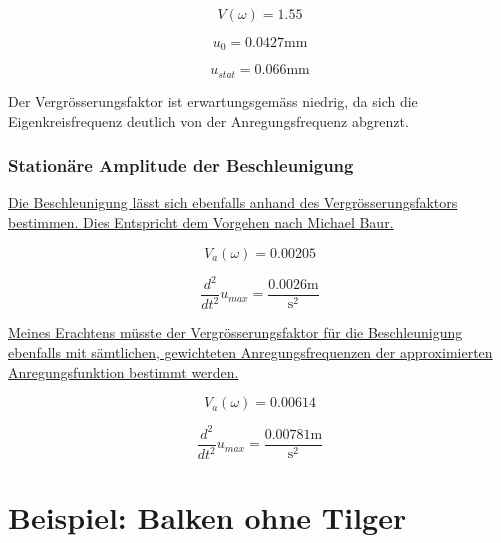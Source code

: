 \documentclass[
  letterpaper,
  DIV=11]{scrreprt}
\begin{document}
\begin{equation}V{\left(\omega \right)} = 1.55\end{equation}

\begin{equation}u_{0} = 0.0427 \text{mm}\end{equation}

\begin{equation}u_{stat} = 0.066 \text{mm}\end{equation}

Der Vergrösserungsfaktor ist erwartungsgemäss niedrig, da sich die
Eigenkreisfrequenz deutlich von der Anregungsfrequenz abgrenzt.

\hypertarget{stationuxe4re-amplitude-der-beschleunigung}{%
\subsection{Stationäre Amplitude der
Beschleunigung}\label{stationuxe4re-amplitude-der-beschleunigung}}

\ul{Die Beschleunigung lässt sich ebenfalls anhand des
Vergrösserungsfaktors bestimmen. Dies Entspricht dem Vorgehen nach
Michael Baur.}

\begin{equation}V_{a}{\left(\omega \right)} = 0.00205\end{equation}

\begin{equation}\frac{d^{2}}{d t^{2}} u_{max} = \frac{0.0026 \text{m}}{\text{s}^{2}}\end{equation}

\ul{Meines Erachtens müsste der Vergrösserungsfaktor für die
Beschleunigung ebenfalls mit sämtlichen, gewichteten Anregungsfrequenzen
der approximierten Anregungsfunktion bestimmt werden.}

\begin{equation}V_{a}{\left(\omega \right)} = 0.00614\end{equation}

\begin{equation}\frac{d^{2}}{d t^{2}} u_{max} = \frac{0.00781 \text{m}}{\text{s}^{2}}\end{equation}

\hypertarget{beispiel-balken-ohne-tilger}{%
\chapter{Beispiel: Balken ohne
Tilger}\label{beispiel-balken-ohne-tilger}}
\end{document}
